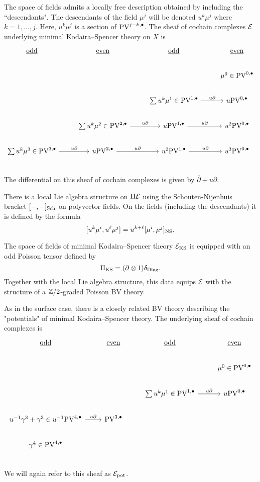 \documentclass[11pt]{article}
\newcommand\bu{\bullet}
\newcommand\dbar{\overline{\partial}}
\begin{document}
The space of fields admits a locally free description obtained by including the ``descendants". 
The descendants of the field $\mu^j$ will be denoted $u^k \mu^j$ where $k = 1,\ldots, j$.
Here, $u^k \mu^j$ is a section of $\PV^{j - k, \bu}$. 
The sheaf of cochain complexes $\mathcal{E}$ underlying minimal Kodaira--Spencer theory on $X$ is 
\[
\begin{tikzcd}
\ul{\rm odd} & \ul{\rm even} & \ul{\rm odd} & \ul{\rm even} \\
& & & \mu^0 \in \PV^{0,\bu} \\
& & \sum u^k \mu^1 \in \PV^{1,\bu} \ar[r, "u \partial"] & u \PV^{0,\bu} \\
& \sum u^k \mu^2 \in  \PV^{2,\bu} \ar[r,"u \del"] & u \PV^{1,\bu} \ar[r, "u \partial"] & u^2 \PV^{0,\bu} \\ 
\sum u^k \mu^3 \in \PV^{3,\bu} \ar[r, "u \del"]& u \PV^{2,\bu} \ar[r,"u \del"] & u^2 \PV^{1,\bu} \ar[r, "u \partial"] & u^3\PV^{0,\bu} \\ 
\end{tikzcd}
\]
The differential on this sheaf of cochain complexes is given by $\dbar + u \partial$. 

There is a local Lie algebra structure on $\Pi\mathcal{E}$ using the Schouten-Nijenhuis bracket $[-,-]_{\rm Sch}$ on polyvector fields.
On the fields (including the descendants) it is defined by the formula
\[
[u^k \mu^i , u^\ell \mu^j] = u^{k+\ell} [\mu^i, \mu^j]_{\rm NS} .
\]

The space of fields of minimal Kodaira--Spencer theory $\mathcal{E}_{\rm KS}$ is equipped with an odd Poisson tensor defined by 
\[
\Pi_{\rm KS} = (\partial \otimes 1) \delta_{\rm Diag} .
\]
Together with the local Lie algebra structure, this data equips $\mathcal{E}$ with the structure of a $\mathbb{Z}/2$-graded Poisson BV theory.

As in the surface case, there is a closely related BV theory describing the "potentials" of minimal Kodaira--Spencer theory.
The underlying sheaf of cochain complexes is 
\[
\begin{tikzcd}
\ul{\rm odd} & \ul{\rm even} & \ul{\rm odd} & \ul{\rm even} \\
& & & \mu^{0}\in\PV^{0,\bu} \\
& & \sum u^k \mu^{1}\in\PV^{1,\bu} \ar[r, "u \partial"] & u \PV^{0,\bu} \\
u^{-1} \gamma^3 + \gamma^3  \in u^{-1} \PV^{4,\bu} \ar[r, "u \partial"] & \PV^{3,\bu} & &  \\
\gamma^{4} \in\PV^{4,\bu} &  &  & \\
\end{tikzcd}
\]
We will again refer to this sheaf as $\mathcal{E}_{\rm pot}$.
\end{document}
